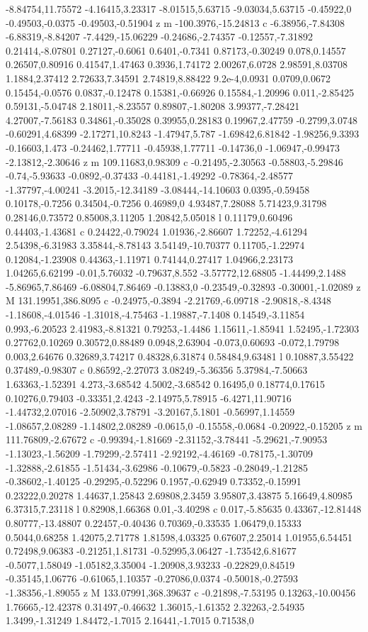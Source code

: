 -8.84754,11.75572 -4.16415,3.23317 -8.01515,5.63715 -9.03034,5.63715 -0.45922,0 -0.49503,-0.0375 -0.49503,-0.51904 z m -100.3976,-15.24813 c -6.38956,-7.84308 -6.88319,-8.84207 -7.4429,-15.06229 -0.24686,-2.74357 -0.12557,-7.31892 0.21414,-8.07801 0.27127,-0.6061 0.6401,-0.7341 0.87173,-0.30249 0.078,0.14557 0.26507,0.80916 0.41547,1.47463 0.3936,1.74172 2.00267,6.0728 2.98591,8.03708 1.1884,2.37412 2.72633,7.34591 2.74819,8.88422 9.2e-4,0.0931 0.0709,0.0672 0.15454,-0.0576 0.0837,-0.12478 0.15381,-0.66926 0.15584,-1.20996 0.011,-2.85425 0.59131,-5.04748 2.18011,-8.23557 0.89807,-1.80208 3.99377,-7.28421 4.27007,-7.56183 0.34861,-0.35028 0.39955,0.28183 0.19967,2.47759 -0.2799,3.0748 -0.60291,4.68399 -2.17271,10.8243 -1.47947,5.787 -1.69842,6.81842 -1.98256,9.3393 -0.16603,1.473 -0.24462,1.77711 -0.45938,1.77711 -0.14736,0 -1.06947,-0.99473 -2.13812,-2.30646 z m 109.11683,0.98309 c -0.21495,-2.30563 -0.58803,-5.29846 -0.74,-5.93633 -0.0892,-0.37433 -0.44181,-1.49292 -0.78364,-2.48577 -1.37797,-4.00241 -3.2015,-12.34189 -3.08444,-14.10603 0.0395,-0.59458 0.10178,-0.7256 0.34504,-0.7256 0.46989,0 4.93487,7.28088 5.71423,9.31798 0.28146,0.73572 0.85008,3.11205 1.20842,5.05018 l 0.11179,0.60496 0.44403,-1.43681 c 0.24422,-0.79024 1.01936,-2.86607 1.72252,-4.61294 2.54398,-6.31983 3.35844,-8.78143 3.54149,-10.70377 0.11705,-1.22974 0.12084,-1.23908 0.44363,-1.11971 0.74144,0.27417 1.04966,2.23173 1.04265,6.62199 -0.01,5.76032 -0.79637,8.552 -3.57772,12.68805 -1.44499,2.1488 -5.86965,7.86469 -6.08804,7.86469 -0.13883,0 -0.23549,-0.32893 -0.30001,-1.02089 z M 131.19951,386.8095 c -0.24975,-0.3894 -2.21769,-6.09718 -2.90818,-8.4348 -1.18608,-4.01546 -1.31018,-4.75463 -1.19887,-7.1408 0.14549,-3.11854 0.993,-6.20523 2.41983,-8.81321 0.79253,-1.4486 1.15611,-1.85941 1.52495,-1.72303 0.27762,0.10269 0.30572,0.88489 0.0948,2.63904 -0.073,0.60693 -0.072,1.79798 0.003,2.64676 0.32689,3.74217 0.48328,6.31874 0.58484,9.63481 l 0.10887,3.55422 0.37489,-0.98307 c 0.86592,-2.27073 3.08249,-5.36356 5.37984,-7.50663 1.63363,-1.52391 4.273,-3.68542 4.5002,-3.68542 0.16495,0 0.18774,0.17615 0.10276,0.79403 -0.33351,2.4243 -2.14975,5.78915 -6.4271,11.90716 -1.44732,2.07016 -2.50902,3.78791 -3.20167,5.1801 -0.56997,1.14559 -1.08657,2.08289 -1.14802,2.08289 -0.0615,0 -0.15558,-0.0684 -0.20922,-0.15205 z m 111.76809,-2.67672 c -0.99394,-1.81669 -2.31152,-3.78441 -5.29621,-7.90953 -1.13023,-1.56209 -1.79299,-2.57411 -2.92192,-4.46169 -0.78175,-1.30709 -1.32888,-2.61855 -1.51434,-3.62986 -0.10679,-0.5823 -0.28049,-1.21285 -0.38602,-1.40125 -0.29295,-0.52296 0.1957,-0.62949 0.73352,-0.15991 0.23222,0.20278 1.44637,1.25843 2.69808,2.3459 3.95807,3.43875 5.16649,4.80985 6.37315,7.23118 l 0.82908,1.66368 0.01,-3.40298 c 0.017,-5.85635 0.43367,-12.81448 0.80777,-13.48807 0.22457,-0.40436 0.70369,-0.33535 1.06479,0.15333 0.5044,0.68258 1.42075,2.71778 1.81598,4.03325 0.67607,2.25014 1.01955,6.54451 0.72498,9.06383 -0.21251,1.81731 -0.52995,3.06427 -1.73542,6.81677 -0.5077,1.58049 -1.05182,3.35004 -1.20908,3.93233 -0.22829,0.84519 -0.35145,1.06776 -0.61065,1.10357 -0.27086,0.0374 -0.50018,-0.27593 -1.38356,-1.89055 z M 133.07991,368.39637 c -0.21898,-7.53195 0.13263,-10.00456 1.76665,-12.42378 0.31497,-0.46632 1.36015,-1.61352 2.32263,-2.54935 1.3499,-1.31249 1.84472,-1.7015 2.16441,-1.7015 0.71538,0 